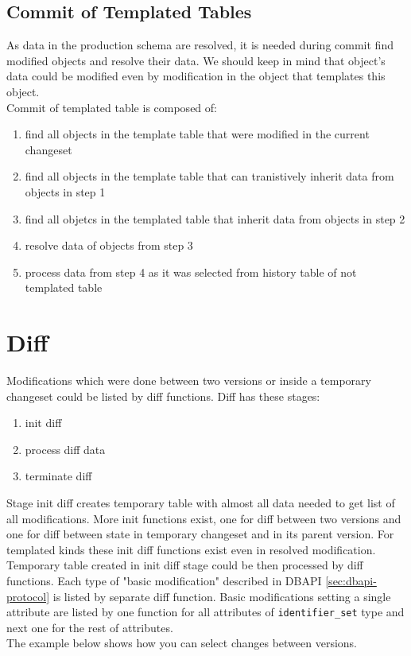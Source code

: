 \documentclass[deska]{subfiles}
\begin{document}
\subsection{Commit of Templated Tables}
As data in the production schema are resolved, it is needed during commit find modified objects and resolve their data. We should keep in mind that object's data could be modified even by modification in the object that templates this object.\\
Commit of templated table is composed of:
\begin{enumerate}
    \item find all objects in the template table that were modified in the current changeset
    \item find all objects in the template table that can tranistively inherit data from objects in step 1
    \item find all objetcs in the templated table that inherit data from objects in step 2
    \item resolve data of objects from step 3
    \item process data from step 4 as it was selected from history table of not templated table
\end{enumerate}

\section{Diff}
Modifications which were done between two versions or inside a temporary changeset could be listed by diff functions. Diff has these stages:
\begin{enumerate}
    \item init diff
    \item process diff data
    \item terminate diff
\end{enumerate}
Stage init diff creates temporary table with almost all data needed to get list of all modifications.
More init functions exist, one for diff between two versions and one for diff between state in temporary changeset and in its parent version. For templated kinds these init diff functions exist even in resolved modification.\\
Temporary table created in init diff stage could be then processed by diff functions. Each type of "basic modification" described in DBAPI \ref{sec:dbapi-protocol} is listed by separate diff function. Basic modifications setting a single attribute are listed by one function for all attributes of {\tt identifier\_set} type and next one for the rest of attributes.\\
The example below shows how you can select changes between versions.
\end{document}
